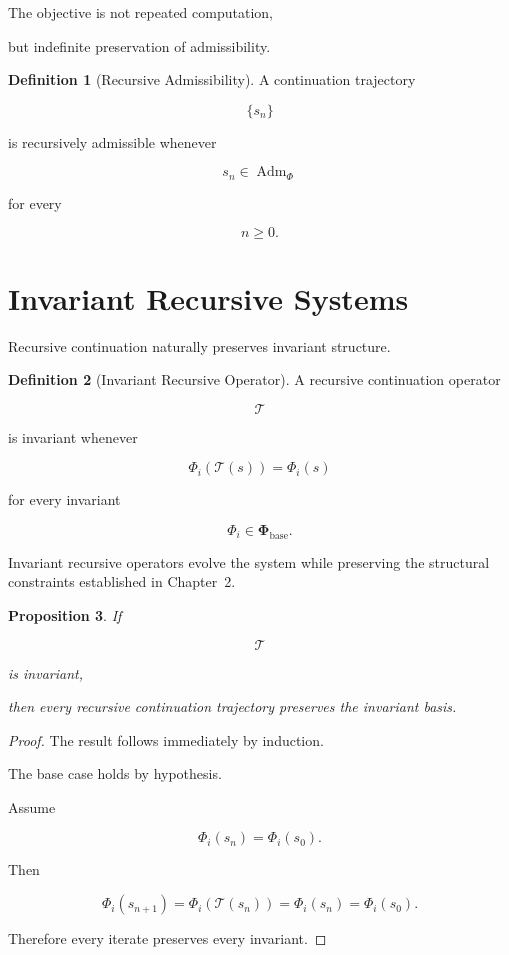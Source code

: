 \documentclass[11pt]{book}
\numberwithin{equation}{chapter}
\theoremstyle{definition}
\newtheorem{definition}{Definition}[chapter]
\theoremstyle{plain}
\newtheorem{proposition}[definition]{Proposition}
\begin{document}
The objective is not repeated computation,

but indefinite preservation of admissibility.

\begin{definition}[Recursive Admissibility]

A continuation trajectory

\[
\{s_n\}
\]

is recursively admissible whenever

\[
s_n
\in
\operatorname{Adm}_{\Phi}
\]

for every

\[
n\ge0.
\]

\end{definition}

\section{Invariant Recursive Systems}

Recursive continuation naturally preserves invariant structure.

\begin{definition}[Invariant Recursive Operator]

A recursive continuation operator

\[
\mathcal T
\]

is invariant whenever

\[
\Phi_i(\mathcal T(s))
=
\Phi_i(s)
\]

for every invariant

\[
\Phi_i
\in
\mathbf{\Phi}_{\mathrm{base}}.
\]

\end{definition}

Invariant recursive operators evolve the system while preserving the
structural constraints established in Chapter~2.

\begin{proposition}

If

\[
\mathcal T
\]

is invariant,

then every recursive continuation trajectory preserves the invariant
basis.

\end{proposition}

\begin{proof}

The result follows immediately by induction.

The base case holds by hypothesis.

Assume

\[
\Phi_i(s_n)
=
\Phi_i(s_0).
\]

Then

\[
\Phi_i(s_{n+1})
=
\Phi_i(\mathcal T(s_n))
=
\Phi_i(s_n)
=
\Phi_i(s_0).
\]

Therefore every iterate preserves every invariant.

\end{proof}
\end{document}
